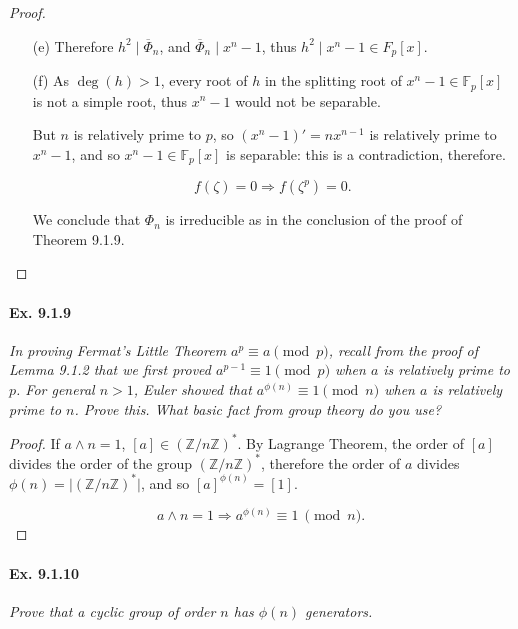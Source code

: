 \documentclass[11pt,a4paper]{article}
\newcommand{\Z}{\mathbb{Z}}
\newcommand{\F}{\mathbb{F}}
\begin{document}
\begin{proof}
\begin{enumerate}
\item[(e)] 
Therefore $h^2 \mid\overline{\Phi}_n$, and $\overline{\Phi}_n \mid x^n-1$, thus $h^2 \mid x^n-1\in F_p[x]$.

\item[(f)] As $\deg(h)>1$, every root of $h$ in the splitting root of $x^n-1\in \F_p[x]$ is not a simple root, thus $x^n-1$ would not be separable.

But $n$ is relatively prime to $p$, so $(x^n-1)' = nx^{n-1}$ is relatively prime to $x^n-1$, and so $x^n-1 \in \F_p[x]$ is separable: this is a contradiction, therefore.


$$f(\zeta) = 0 \Rightarrow f(\zeta^p)=0.$$

We conclude that $\Phi_n$ is irreducible as in the conclusion of the proof of Theorem 9.1.9.
\end{enumerate}
\end{proof}

\paragraph{Ex. 9.1.9}

{\it In proving Fermat's Little Theorem $a^p\equiv a \pmod p$, recall from the proof of Lemma 9.1.2 that we first proved $a^{p-1} \equiv 1 \pmod p$ when $a$ is relatively prime to $p$. For general $n>1$, Euler showed that $a^{\phi(n)} \equiv 1 \pmod n$ when $a$ is relatively prime to $n$. Prove this. What basic fact from group theory do you use?
}

\begin{proof}
If $a \wedge n = 1$, $[a] \in (\Z/n\Z)^*$.
By Lagrange Theorem, the order of $[a]$ divides the order of the group $(\Z/n\Z)^*$, therefore the order of $a$ divides $ \phi(n) = \vert (\Z/n\Z)^* \vert$, and so $[a]^{\phi(n)} = [1]$.

$$a \wedge n = 1 \Rightarrow a^{\phi(n)} \equiv 1 \ \pmod n.$$
\end{proof}

\paragraph{Ex. 9.1.10}

{\it Prove that a cyclic group of order $n$ has $\phi(n)$ generators.
}
\end{document}
